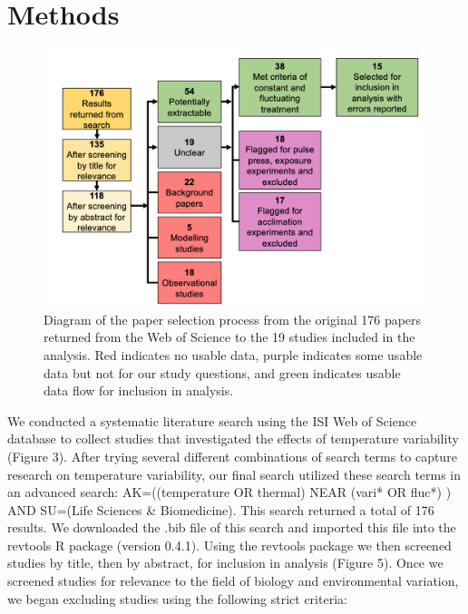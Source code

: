 \documentclass[12pt,twoside]{reedthesis}
\begin{document}
\hypertarget{methods}{%
\chapter*{Methods}\label{methods}}
\begin{figure}
\includegraphics[width=0.9\linewidth]{figures/figure5} \caption{Diagram of the paper selection process from the original 176 papers returned from the Web of Science to the 19 studies included in the analysis. Red indicates no usable data, purple indicates some usable data but not for our study questions, and green indicates usable data flow for inclusion in analysis.}\label{fig:unnamed-chunk-7}
\end{figure}
We conducted a systematic literature search using the ISI Web of Science database to collect studies that investigated the effects of temperature variability (Figure 3). After trying several different combinations of search terms to capture research on temperature variability, our final search utilized these search terms in an advanced search: AK=((temperature OR thermal) NEAR (vari* OR fluc*) ) AND SU=(Life Sciences \& Biomedicine). This search returned a total of 176 results. We downloaded the .bib file of this search and imported this file into the revtools R package (version 0.4.1). Using the revtools package we then screened studies by title, then by abstract, for inclusion in analysis (Figure 5). Once we screened studies for relevance to the field of biology and environmental variation, we began excluding studies using the following strict criteria:
\end{document}
